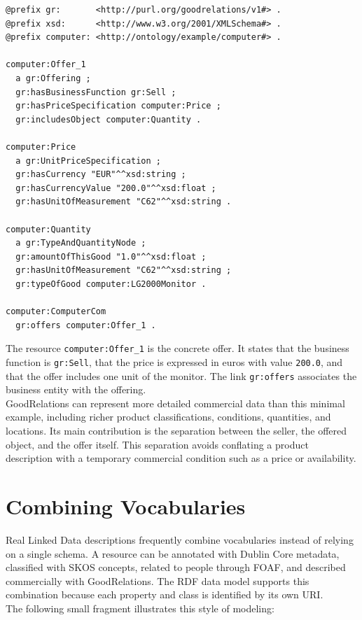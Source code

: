 \documentclass{scrbook}
\begin{document}
	\begin{lstlisting}
@prefix gr:       <http://purl.org/goodrelations/v1#> .
@prefix xsd:      <http://www.w3.org/2001/XMLSchema#> .
@prefix computer: <http://ontology/example/computer#> .
	
computer:Offer_1
  a gr:Offering ;
  gr:hasBusinessFunction gr:Sell ;
  gr:hasPriceSpecification computer:Price ;
  gr:includesObject computer:Quantity .

computer:Price
  a gr:UnitPriceSpecification ;
  gr:hasCurrency "EUR"^^xsd:string ;
  gr:hasCurrencyValue "200.0"^^xsd:float ;
  gr:hasUnitOfMeasurement "C62"^^xsd:string .

computer:Quantity
  a gr:TypeAndQuantityNode ;
  gr:amountOfThisGood "1.0"^^xsd:float ;
  gr:hasUnitOfMeasurement "C62"^^xsd:string ;
  gr:typeOfGood computer:LG2000Monitor .
	
computer:ComputerCom
  gr:offers computer:Offer_1 .
	\end{lstlisting}
	
	The resource \texttt{computer:Offer\_1} is the concrete offer. It states that the business function is \texttt{gr:Sell}, that the price is expressed in euros with value \texttt{200.0}, and that the offer includes one unit of the monitor. The link \texttt{gr:offers} associates the business entity with the offering.\\
	
	GoodRelations can represent more detailed commercial data than this minimal example, including richer product classifications, conditions, quantities, and locations. Its main contribution is the separation between the seller, the offered object, and the offer itself. This separation avoids conflating a product description with a temporary commercial condition such as a price or availability.
	
	\section{Combining Vocabularies}
	
	Real Linked Data descriptions frequently combine vocabularies instead of relying on a single schema. A resource can be annotated with Dublin Core metadata, classified with SKOS concepts, related to people through FOAF, and described commercially with GoodRelations. The RDF data model supports this combination because each property and class is identified by its own URI.\\
	
	The following small fragment illustrates this style of modeling:
	
\end{document}
